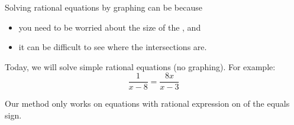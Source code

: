 Solving rational equations by graphing can be  
because
\begin{itemize}[nosep]
    \item you need to be worried about the size of the \myTi {}, and
    \item it can be difficult to see where the intersections are.
\end{itemize}

Today, we will solve simple rational equations  
(no graphing).
For example: \[\frac{1}{x-8} = \frac{8x}{x-3}\]
\begin{tcolorbox}[colback=white,center,width=5.25in,]
    \small
    Our method only works on equations with 
     rational expression on   of the equals sign.
\end{tcolorbox}

